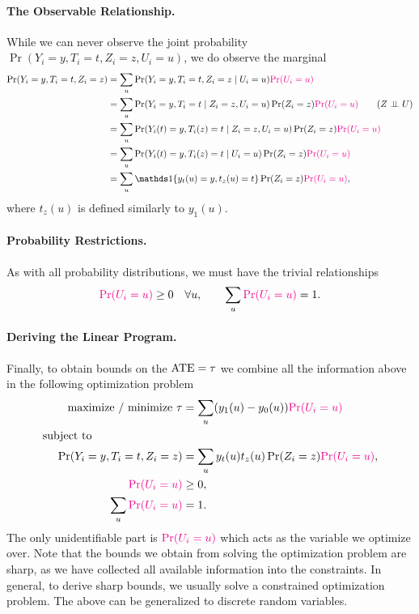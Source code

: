 \documentclass[11pt]{exam}
\begin{document}
\paragraph{The Observable Relationship.}
While we can never observe the joint probability $\Pr(Y_i = y, T_i = t, Z_i = z, U_i = u)$, we do observe the marginal
\begin{align*}
    \Pr(Y_i = y, T_i = t, Z_i = z) &= \sum_{u} \Pr(Y_i = y, T_i = t, Z_i = z \mid U_i = u) \textcolor{magenta}{\Pr(U_i = u)}
   \\
   &= \sum_{u} \Pr(Y_i = y, T_i = t\mid Z_i = z, U_i = u) \Pr(Z_i = z) \textcolor{magenta}{\Pr(U_i = u)} \qquad \text{($Z \ind U$)}
   \\
   &= \sum_{u} \Pr(Y_i(t) = y, T_i(z) = t\mid Z_i = z, U_i = u) \Pr(Z_i = z) \textcolor{magenta}{\Pr(U_i = u)} 
   \\
   &= \sum_{u} \Pr(Y_i(t) = y, T_i(z) = t \mid U_i = u) \Pr(Z_i = z) \textcolor{magenta}{\Pr(U_i = u)}
   \\
   &= \sum_{u} \indicator{y_t(u) = y, t_z(u) = t} \Pr(Z_i = z) \textcolor{magenta}{\Pr(U_i = u)},
\end{align*}
where $t_z(u)$ is defined similarly to $y_1(u)$.


\paragraph{Probability Restrictions.}
As with all probability distributions, we must have the trivial relationships
\begin{align*}
    \textcolor{magenta}{\Pr(U_i = u)} \geq 0  \quad \forall u, \qquad \sum_u \textcolor{magenta}{\Pr(U_i = u)} = 1.
\end{align*}

\paragraph{Deriving the Linear Program.}
Finally, to obtain bounds on the $\mathrm{ATE} = \tau$ we combine all the information above in the following optimization problem
\begin{align*}
    \text{maximize / minimize } \tau &= \sum_{u} (y_1(u) - y_0(u)) \textcolor{magenta}{\Pr(U_i = u)}
    \\
    \text{subject to} \qquad \qquad \qquad \qquad &
    \\
    \Pr(Y_i = y, T_i = t, Z_i = z) &= \sum_{u} y_t(u) t_z(u) \Pr(Z_i = z) \textcolor{magenta}{\Pr(U_i = u)},
    \\
    \textcolor{magenta}{\Pr(U_i = u)} &\geq 0,
    \\
    \sum_u \textcolor{magenta}{\Pr(U_i = u)} &= 1.
\end{align*}
The only unidentifiable part is $\textcolor{magenta}{\Pr(U_i = u)}$ which acts as the variable we optimize over. Note that the bounds we obtain from solving the optimization problem are sharp, as we have collected all available information into the constraints. In general, to derive sharp bounds, we usually solve a constrained optimization problem.
The above can be generalized to discrete random variables.
\end{document}
